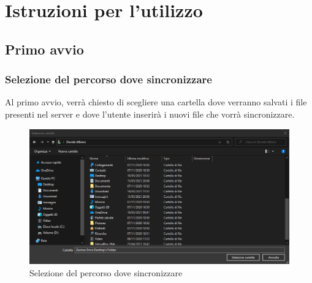 \section{Istruzioni per l'utilizzo}

\subsection{Primo avvio}
\subsubsection{Selezione del percorso dove sincronizzare}
\label{sec:selezionepath}
Al primo avvio, verrà chiesto di scegliere una cartella dove verranno salvati i file presenti nel server e dove l'utente inserirà i nuovi file che vorrà sincronizzare.
\begin{figure}[H]
    \centering
    \includegraphics[scale = 0.50]{components/img/selezione-path.png}
    \caption{Selezione del percorso dove sincronizzare}
    \label{fig:Selezione del percorso dove sincronizzare}
\end{figure}


